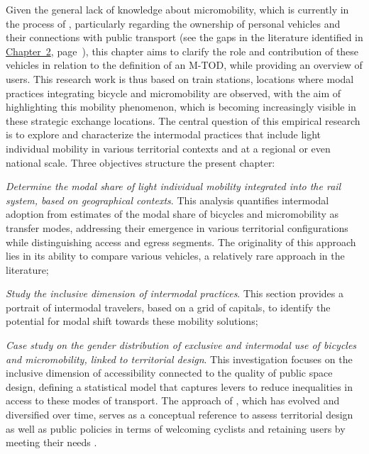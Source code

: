 \begin{refsegment}
Given the general lack of knowledge about \gls{micromobility}, which is currently in the process of , particularly regarding the ownership of personal vehicles \textcolor{blue}{\autocites{richer_dossier_2021}[19]{pages_nouveaux_2021}} and their connections with public transport (see the gaps in the literature identified in \hyperref[chap2:titre]{Chapter~2}, page~\pageref{chap2:titre}), this chapter aims to clarify the role and contribution of these vehicles in relation to the definition of an \acrfull{M-TOD}, while providing an overview of users. This research work is thus based on train stations, locations where modal practices integrating \gls{bicycle} and micromobility are observed, with the aim of highlighting this mobility phenomenon, which is becoming increasingly visible in these strategic exchange locations. The central question of this empirical research is to explore and characterize the intermodal practices that include light individual mobility in various territorial contexts and at a regional or even national scale. Three objectives structure the present chapter:
\begin{customitemize}
    \item \textsl{Determine the modal share of light individual mobility integrated into the rail system, based on geographical contexts}. This analysis quantifies intermodal adoption from estimates of the modal share of bicycles and micromobility as transfer modes, addressing their emergence in various territorial configurations while distinguishing access and egress segments. The originality of this approach lies in its ability to compare various vehicles, a relatively rare approach in the literature;
    \item \textsl{Study the inclusive dimension of intermodal practices}. This section provides a portrait of intermodal travelers, based on a grid of capitals, to identify the potential for modal shift towards these mobility solutions;
    \item \textsl{Case study on the gender distribution of exclusive and intermodal use of bicycles and micromobility, linked to territorial design}. This investigation focuses on the inclusive dimension of accessibility connected to the quality of public space design, defining a statistical model that captures levers to reduce inequalities in access to these modes of transport. The approach of , which has evolved and diversified over time, serves as a conceptual reference to assess territorial design as well as public policies in terms of welcoming cyclists and retaining users by meeting their needs \textcolor{blue}{\autocite[3]{talandier_lhospitalite_2023}}.
\end{customitemize}%


\end{refsegment}
